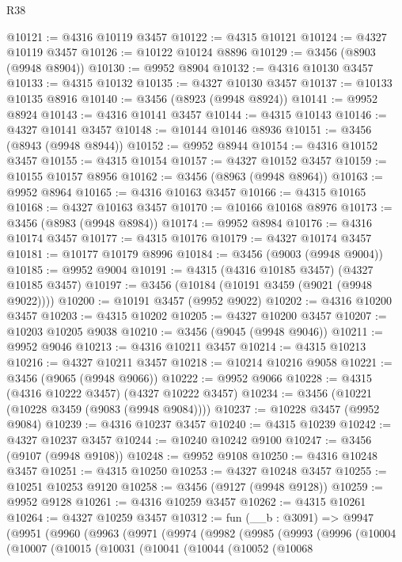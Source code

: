 \begin{lexlean}{R38}
\begin{coremodule}
@10121 := @4316 @10119 @3457
@10122 := @4315 @10121
@10124 := @4327 @10119 @3457
@10126 := @10122 @10124 @8896
@10129 := @3456 (@8903 (@9948 @8904))
@10130 := @9952 @8904
@10132 := @4316 @10130 @3457
@10133 := @4315 @10132
@10135 := @4327 @10130 @3457
@10137 := @10133 @10135 @8916
@10140 := @3456 (@8923 (@9948 @8924))
@10141 := @9952 @8924
@10143 := @4316 @10141 @3457
@10144 := @4315 @10143
@10146 := @4327 @10141 @3457
@10148 := @10144 @10146 @8936
@10151 := @3456 (@8943 (@9948 @8944))
@10152 := @9952 @8944
@10154 := @4316 @10152 @3457
@10155 := @4315 @10154
@10157 := @4327 @10152 @3457
@10159 := @10155 @10157 @8956
@10162 := @3456 (@8963 (@9948 @8964))
@10163 := @9952 @8964
@10165 := @4316 @10163 @3457
@10166 := @4315 @10165
@10168 := @4327 @10163 @3457
@10170 := @10166 @10168 @8976
@10173 := @3456 (@8983 (@9948 @8984))
@10174 := @9952 @8984
@10176 := @4316 @10174 @3457
@10177 := @4315 @10176
@10179 := @4327 @10174 @3457
@10181 := @10177 @10179 @8996
@10184 := @3456 (@9003 (@9948 @9004))
@10185 := @9952 @9004
@10191 := @4315 (@4316 @10185 @3457) (@4327 @10185 @3457)
@10197 := @3456 (@10184 (@10191 @3459 (@9021 (@9948 @9022))))
@10200 := @10191 @3457 (@9952 @9022)
@10202 := @4316 @10200 @3457
@10203 := @4315 @10202
@10205 := @4327 @10200 @3457
@10207 := @10203 @10205 @9038
@10210 := @3456 (@9045 (@9948 @9046))
@10211 := @9952 @9046
@10213 := @4316 @10211 @3457
@10214 := @4315 @10213
@10216 := @4327 @10211 @3457
@10218 := @10214 @10216 @9058
@10221 := @3456 (@9065 (@9948 @9066))
@10222 := @9952 @9066
@10228 := @4315 (@4316 @10222 @3457) (@4327 @10222 @3457)
@10234 := @3456 (@10221 (@10228 @3459 (@9083 (@9948 @9084))))
@10237 := @10228 @3457 (@9952 @9084)
@10239 := @4316 @10237 @3457
@10240 := @4315 @10239
@10242 := @4327 @10237 @3457
@10244 := @10240 @10242 @9100
@10247 := @3456 (@9107 (@9948 @9108))
@10248 := @9952 @9108
@10250 := @4316 @10248 @3457
@10251 := @4315 @10250
@10253 := @4327 @10248 @3457
@10255 := @10251 @10253 @9120
@10258 := @3456 (@9127 (@9948 @9128))
@10259 := @9952 @9128
@10261 := @4316 @10259 @3457
@10262 := @4315 @10261
@10264 := @4327 @10259 @3457
@10312 := fun (__b : @3091) =>
  @9947
    (@9951
      (@9960
        (@9963
          (@9971
            (@9974
              (@9982
                (@9985
                  (@9993
                    (@9996
                      (@10004
                        (@10007
                          (@10015
                            (@10031
                              (@10041
                                (@10044
                                  (@10052
                                    (@10068

\end{coremodule}
\end{lexlean}
